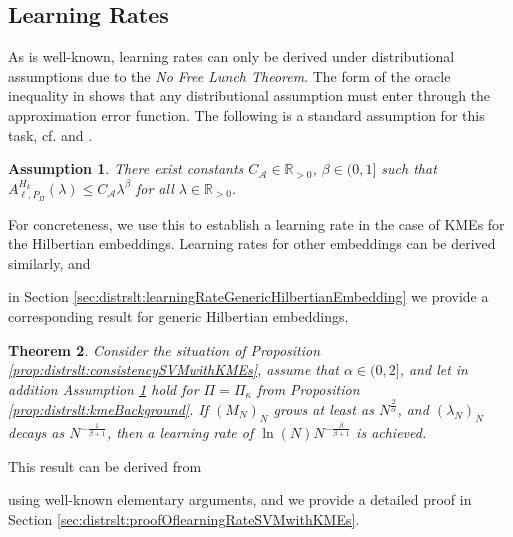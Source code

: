 \documentclass[letterpaper]{article} %
\newcommand{\R}{\mathbb{R}}
\newcommand{\Rp}{\R_{> 0}}
\newcommand{\KME}[1]{\Pi_{#1}} %
\newcommand{\hilbertianEmbed}{\Pi} %
\newcommand{\kKME}{\kappa} %
\newcommand{\KMEk}{\KME{\kKME}} %
\newcommand{\ApproxErrorFunc}[3]{A^{#3}_{#1,#2}}
\newcommand{\Aef}{\ApproxErrorFunc{\ell}{P_\hilbertianEmbed}{H_k}}
\newcommand{\defm}[1]{\emph{#1}}
\newtheorem{theorem}{Theorem}
\newtheorem{assumption}[theorem]{Assumption}
\newif\ifCameraReady
\begin{document}
\subsection{Learning Rates} \label{sec:distrslt:learningRates}
As is well-known, learning rates can only be derived under distributional assumptions due to the \defm{No Free Lunch Theorem}.
The form of the oracle inequality in  shows that any distributional assumption must enter through the approximation error function.
The following is a standard assumption for this task, cf. \cite[Chapter~6]{SC08} and \cite{steinwart2009optimal}.
\begin{assumption} \label{assumption:distrslt:decayApproxErrorFunc}
There exist constants $C_\mathcal{A} \in\Rp$, $\beta\in(0,1]$ such that $\Aef(\lambda) \leq C_\mathcal{A}\lambda^\beta$ for all $\lambda\in\Rp$. 
\end{assumption}
For concreteness, we use this to establish a learning rate in the case of KMEs for the Hilbertian embeddings.
Learning rates for other embeddings can be derived similarly, and 
\ifCameraReady
in the supplementary material we provide a corresponding result for generic Hilbertian embeddings.
\else
in Section \ref{sec:distrslt:learningRateGenericHilbertianEmbedding} we provide a corresponding result for generic Hilbertian embeddings.
\fi
\begin{theorem} \label{thm:distrslt:learningRateSVMwithKMEs}
Consider the situation of Proposition \ref{prop:distrslt:consistencySVMwithKMEs},
assume that $\alpha\in(0,2]$,
and let in addition Assumption \ref{assumption:distrslt:decayApproxErrorFunc} hold for $\hilbertianEmbed=\KMEk$ from Proposition \ref{prop:distrslt:kmeBackground}.
If $(M_N)_N$ grows at least as $N^{\frac{2}{\alpha}}$, and $(\lambda_N)_N$ decays as $N^{-\frac{1}{\beta+1}}$, then a learning rate of $\ln(N) N^{-\frac{\beta}{\beta+1}}$ is achieved.
\end{theorem}
This result can be derived from  
\ifCameraReady
using well-known elementary arguments.
\else
using well-known elementary arguments, and we provide a detailed proof in Section \ref{sec:distrslt:proofOflearningRateSVMwithKMEs}.
\fi
\end{document}
